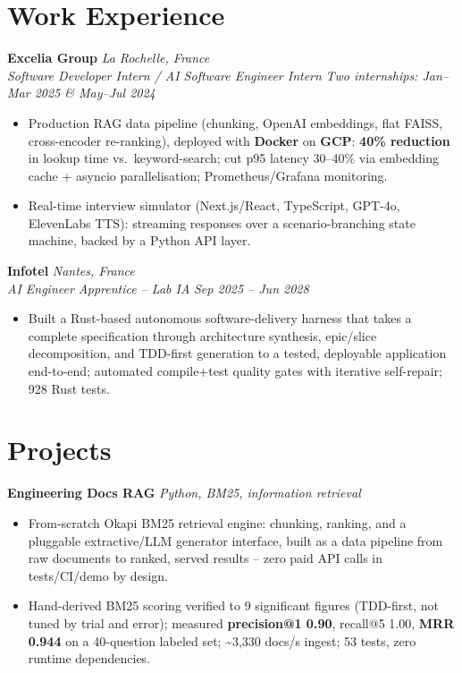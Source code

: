 \documentclass[10pt]{article}
\newcommand{\entry}[4]{%
  \noindent\textbf{#1} \hfill \textit{#2} \\
  \textit{#3} \hfill \textit{#4}\\[-0.3em]
}
\newcommand{\projectentry}[2]{%
  \noindent\textbf{#1} \hfill \textit{#2}\\[-0.3em]
}
\begin{document}
\section*{Work Experience}
\entry{Excelia Group}{La Rochelle, France}{Software Developer Intern / AI Software Engineer Intern}{Two internships: Jan--Mar 2025 \& May--Jul 2024}
\begin{itemize}
  \item Production RAG data pipeline (chunking, OpenAI embeddings, flat FAISS, cross-encoder re-ranking), deployed with \textbf{Docker} on \textbf{GCP}: \textbf{40\% reduction} in lookup time vs.\ keyword-search; cut p95 latency 30--40\% via embedding cache + asyncio parallelisation; Prometheus/Grafana monitoring.
  \item Real-time interview simulator (Next.js/React, TypeScript, GPT-4o, ElevenLabs TTS): streaming responses over a scenario-branching state machine, backed by a Python API layer.
\end{itemize}
\entry{Infotel}{Nantes, France}{AI Engineer Apprentice -- Lab IA}{Sep 2025 -- Jun 2028}
\begin{itemize}
  \item Built a Rust-based autonomous software-delivery harness that takes a complete specification through architecture synthesis, epic/slice decomposition, and TDD-first generation to a tested, deployable application end-to-end; automated compile+test quality gates with iterative self-repair; 928 Rust tests.
\end{itemize}

\section*{Projects}

\projectentry{Engineering Docs RAG}{Python, BM25, information retrieval}
\begin{itemize}
  \item From-scratch Okapi BM25 retrieval engine: chunking, ranking, and a pluggable extractive/LLM generator interface, built as a data pipeline from raw documents to ranked, served results -- zero paid API calls in tests/CI/demo by design.
  \item Hand-derived BM25 scoring verified to 9 significant figures (TDD-first, not tuned by trial and error); measured \textbf{precision@1 0.90}, recall@5 1.00, \textbf{MRR 0.944} on a 40-question labeled set; \textasciitilde3{,}330 docs/s ingest; 53 tests, zero runtime dependencies.
\end{itemize}
\end{document}
